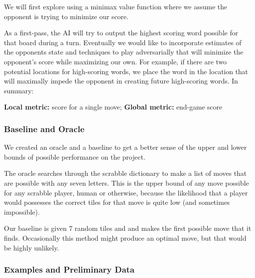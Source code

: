 \documentclass[12pt]{article}
\begin{document}
We will first explore using a minimax value function where we assume
the opponent is trying to minimize our score.

As a first-pass, the AI will try to output the highest scoring word
possible for that board during a turn.  Eventually we would like to
incorporate estimates of the opponents state and techniques to play
adversarially that will minimize the opponent's score while maximizing
our own. For example, if there are two potential locations for
high-scoring words, we place the word in the location that will
maximally impede the opponent in creating future high-scoring
words. In summary:

\textbf{Local metric:} score for a single move; \textbf{Global metric:} end-game score

\subsubsection*{Baseline and Oracle}

We created an oracle and a baseline to get a better sense of the upper
and lower bounds of possible performance on the project.

The oracle searches through the scrabble dictionary to make a list of
moves that are possible with any seven letters. This is the upper bound of
any move possible for any scrabble player, human or otherwise, because
the likelihood that a player would possesses the correct tiles for that
move is quite low (and sometimes impossible).

Our baseline is given 7 random tiles and and makes the
first possible move that it finds. Occasionally this method might
produce an optimal move, but that would be highly unlikely.

\newpage
\subsubsection*{Examples and Preliminary Data}
\end{document}
